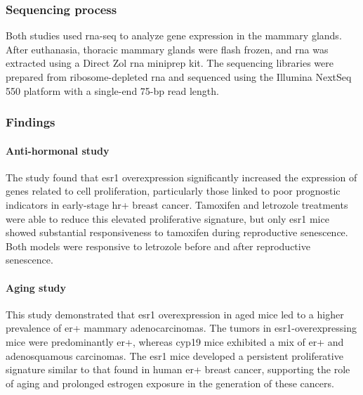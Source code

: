 \subsubsection{Sequencing process} \label{sec:dataset_sequencing}
Both studies used \gls{rna-seq} to analyze gene expression in the mammary
glands.
After euthanasia, thoracic mammary glands were flash frozen, and \gls{rna} was
extracted using a Direct Zol \gls{rna} miniprep kit.
The sequencing libraries were prepared from ribosome-depleted \gls{rna} and
sequenced using the Illumina NextSeq 550 platform with a single-end 75-bp read
length\supercite{furth_esr1_2023,furth_overexpression_2023}.

\subsubsection{Findings}

\paragraph{Anti-hormonal study}
The study found that \gls{esr1} overexpression significantly increased the
expression of genes related to cell proliferation, particularly those linked to
poor prognostic indicators in early-stage \gls{hr+} breast cancer.
Tamoxifen and letrozole treatments were able to reduce this elevated
proliferative signature, but only \gls{esr1} mice showed substantial
responsiveness to tamoxifen during reproductive senescence.
Both models were responsive to letrozole before and after reproductive
senescence\supercite{furth_esr1_2023}.

\paragraph{Aging study}
This study demonstrated that \gls{esr1} overexpression in aged mice led to a
higher prevalence of \gls{er+} mammary adenocarcinomas.
The tumors in \gls{esr1}-overexpressing mice were predominantly \gls{er+},
whereas \gls{cyp19} mice exhibited a mix of \gls{er+} and adenosquamous
carcinomas.
The \gls{esr1} mice developed a persistent proliferative signature similar to
that found in human \gls{er+} breast cancer, supporting the role of aging and
prolonged estrogen exposure in the generation of these
cancers\supercite{furth_overexpression_2023}.
